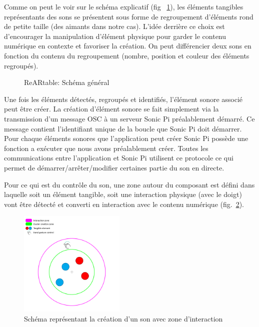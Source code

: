 Comme on peut le voir sur le schéma explicatif (fig ~\ref{fig:reartable:generalscheme}), les éléments tangibles représentants des sons se présentent sous forme de regroupement d'éléments rond de petite taille (des aimants dans notre cas). L'idée derrière ce choix est d'encourager la manipulation d'élément physique pour garder le contenu numérique en contexte et favoriser la création. On peut différencier deux sons en fonction du contenu du regroupement (nombre, position et couleur des éléments regroupés).

\begin{figure}[H]
\centering
\caption{ReARtable: Schéma général}
\label{fig:reartable:generalscheme}
\end{figure}

Une fois les éléments détectés, regroupés et identifiés, l'élément sonore associé peut être créer. La création d'élément sonore se fait simplement via la transmission d'un message OSC à un serveur Sonic Pi préalablement démarré. Ce message contient l'identifiant unique de la boucle que Sonic Pi doit démarrer. Pour chaque éléments sonores que l'application peut créer Sonic Pi possède une fonction a exécuter que nous avons préalablement créer. Toutes les communications entre l'application et Sonic Pi utilisent ce protocole ce qui permet de démarrer/arrêter/modifier certaines partie du son en directe.

Pour ce qui est du contrôle du son, une zone autour du composant est défini dans laquelle soit un élément tangible, soit une interaction physique (avec le doigt) vont être détecté et converti en interaction avec le contenu numérique (fig.~\ref{fig:reartable:interactionzone}).

\begin{figure}[H]
\centering
\includegraphics[width=0.45\textwidth]{images/reartable_cluster_interaction}
\caption{Schéma représentant la création d'un son avec zone d'interaction}
\label{fig:reartable:interactionzone}
\end{figure}

